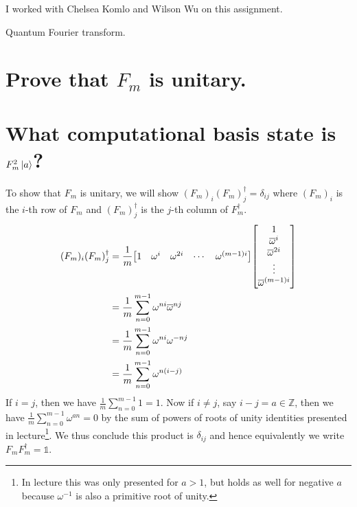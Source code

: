 \documentclass[boxes,pages]{homework}
\begin{document}
\noindent
I worked with Chelsea Komlo and Wilson Wu on this assignment.

\begin{problem}
Quantum Fourier transform.
\begin{parts}
	\part{Prove that $F_m$ is unitary.}\label{part:1a}
	\part{What computational basis state is $F_m^2\ket{a}$?}\label{part:1b}
\end{parts}
\end{problem}

\begin{solution}
	\ref{part:1a}
	To show that $F_m$ is unitary, we will show $(F_m)_i(F_m)^\dagger_j = \delta_{ij}$ where $(F_m)_i$ is the $i$-th row of $F_m$ and $(F_m)^\dagger_j$ is the $j$-th column of $F_m^\dagger$.
	\begin{align*}
		(F_m)_i(F_m)^\dagger_j & = \frac{1}{m}\mqty[1 & \omega^i & \omega^{2i} & \cdots & \omega^{(m - 1)i}]\mqty[1 \\ \overline{\omega}^i \\ \overline{\omega}^{2i} \\ \vdots \\ \overline{\omega}^{(m - 1)i}] \\
		& = \frac{1}{m}\sum_{n = 0}^{m - 1}\omega^{ni}\overline{\omega}^{nj} \\
		& = \frac{1}{m}\sum_{n = 0}^{m - 1}\omega^{ni}\omega^{-nj} \\
		& = \frac{1}{m}\sum_{n = 0}^{m - 1}\omega^{n(i -j)} \\
	\end{align*}
	If $i = j$, then we have $\frac{1}{m}\sum_{n = 0}^{m - 1}1 = 1$. Now if $i\neq j$, say $i - j = a\in\mathbb{Z}$, then we have $\frac{1}{m}\sum_{n = 0}^{m - 1}\omega^{an} = 0$ by the sum of powers of roots of unity identities presented in lecture\footnote{In lecture this was only presented for $a>1$, but holds as well for negative $a$ because $\omega^{-1}$ is also a primitive root of unity.}. We thus conclude this product is $\delta_{ij}$ and hence equivalently we write $F_mF_m^\dagger = \mathbb{1}$.


\end{solution}
\end{document}
